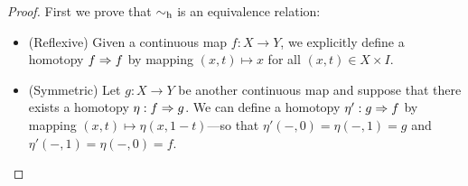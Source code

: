\begin{proof}
    First we prove that \(\sim_{\text{h}}\) is an equivalence relation:
    \begin{itemize}\setlength\itemsep{0em}
        \item (Reflexive) Given a continuous map \(f: X \to Y\), we explicitly define a
              homotopy \(f \Rightarrow f\) by mapping \((x, t) \mapsto x\) for all
              \((x, t) \in X \times I\).

        \item (Symmetric) Let \(g: X \to Y\) be another continuous map and suppose that
              there exists a homotopy \(\eta: f \Rightarrow g\). We can define a homotopy \(\eta':
              g \Rightarrow f\) by mapping \((x, t) \mapsto \eta(x, 1 - t)\)---so that \(\eta'(-,
              0) = \eta(-, 1) = g\) and \(\eta'(-, 1) = \eta(-, 0) = f\).


\end{itemize}
\end{proof}
